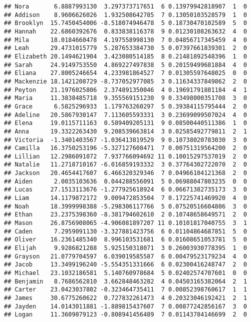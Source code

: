 \documentclass[
]{article}
\begin{document}
\begin{verbatim}
## Nora       6.8887993130  3.297373717651  6 0.13979942818907  1  0
## Addison    8.9606626026  1.932508642785  7 0.13050103528579  1  0
## Brooklyn  15.7450454006 -8.518074946478  5 0.18730470102589  5  0
## Hannah    22.6860392676  0.833838116378  9 0.01230108263632  4  0
## Mila      18.0184660478  4.197558998130  7 0.04856717345459  4  0
## Leah      29.4731015779  5.287653384730  5 0.07397661839301  2  0
## Elizabeth 20.1494621904  3.423080514185  8 0.21481892548396  1  0
## Sarah     24.9149753550  4.869227497838  5 0.20159499681884  4  0
## Eliana    27.8005246654  4.233981864527  7 0.01305597648025  0  0
## Mackenzie 18.1421208729 -8.737052977085  3 0.11634337849862  2  0
## Peyton    21.1976025806  2.374891350046  4 0.19691791881184  4  1
## Maria     11.3838485718  9.355569151230  9 0.33498000351708  3  0
## Grace      6.5825296933  1.179763260297  5 0.39384115795444  2  0
## Adeline   20.5867930147  7.113605593331  3 0.23699099507024  4  0
## Elena     19.0115711163  0.589409205131  9 0.08500440511386  1  0
## Anna      19.3322263430  9.208539663814  3 0.02585492779811  2  1
## Victoria  -1.3401403567 -1.036413819529  9 0.10738020783030  3  0
## Camilla   16.3750253196 -5.327127608471  7 0.00751319564200  2  0
## Lillian   12.2986091072  7.937766094692 11 0.10015297537019  2  0
## Natalie   11.2718710167 -6.016859193332  3 0.37764302722070  2  0
## Jackson   20.4654417607  6.466320329346  7 0.04966104121368  2  0
## Aiden      2.0035103636  0.044288556091  5 0.06988047803235  0  0
## Lucas     27.1513113676 -1.277925618924  6 0.06671382735173  3  0
## Liam      14.1179872172  9.009472853504  7 0.17225741469920  4  0
## Noah      18.3999998388 -5.298306117766  5 0.07520516604806  3  0
## Ethan     23.2375398360 -8.381794602610  2 0.10748658649571  2  0
## Mason     26.8756908065 -4.906081897207 11 0.10101817040755  3  1
## Caden      7.2959091130 -3.327881423756  6 0.01104864687851  5  0
## Oliver    16.2361485340  8.996103531681  6 0.01608651053781  5  0
## Elijah     9.9286821288  5.925150318071  3 0.26003930778395  1  0
## Grayson   21.0779704597  6.039019585587  6 0.00479523179234  4  0
## Jacob     13.3499196240 -5.554351331666  6 0.02300416248747  2  0
## Michael   23.1032186581  5.140760978684  5 0.02402574707601  0  0
## Benjamin   8.7686562810  3.662848463282  4 0.04503165382064  2  1
## Carter    23.0423037802 -0.323464735411  7 0.00852398760617  1  1
## James     30.6775260622  0.727832261473  4 0.20323046192421  2  1
## Jayden    14.0143011881 -1.889815437607  7 0.00877242856167  3  0
## Logan     11.3609079123 -0.808941456489  7 0.01143784146699  2  0

\end{verbatim}
\end{document}
